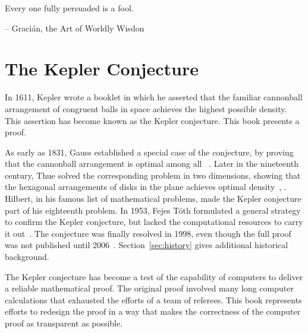 {

\narrower\parindent=0pt
\baselineskip

{\it

Every one fully persuaded is a fool.

{\hfill-- Graci\'an, the Art of Worldly Wisdon} %

}

{

\it



}

}



\newpage

\section*{The Kepler Conjecture}

In 1611, Kepler wrote a booklet in which he asserted that the familiar
cannonball arrangement of congruent balls in space achieves the
highest possible density.  This assertion has become known as the
Kepler conjecture.  This book presents a proof.

As early as 1831, Gauss established a special case of the conjecture,
by proving that the cannonball arrangement is optimal among all
~\cite{Gau31}.  Later in the nineteenth century,
Thue solved the corresponding problem in two dimensions, showing that
the hexagonal arrangements of disks in the plane achieves optimal
density~\cite{Thu92}, \cite{Thu10}.  Hilbert, in his famous list of
mathematical problems, made the Kepler conjecture part of his eighteenth
problem.  In 1953, Fejes T\'oth formulated a general strategy to
confirm the Kepler conjecture, but lacked the computational resources
to carry it out~\cite{Fej53}.  The conjecture was finally resolved in
1998, even though the full proof was not published until
2006~\cite{Hales:2006:DCG}.  Section~\ref{sec:history} gives
additional historical background.

The Kepler conjecture has become a test of the capability of computers to
deliver a reliable mathematical proof.  The original proof 
involved many long computer calculations that
exhausted the efforts of a team of referees.  This book represents 
efforts to redesign the proof in a way that makes the correctness of
the computer proof as transparent as possible.


